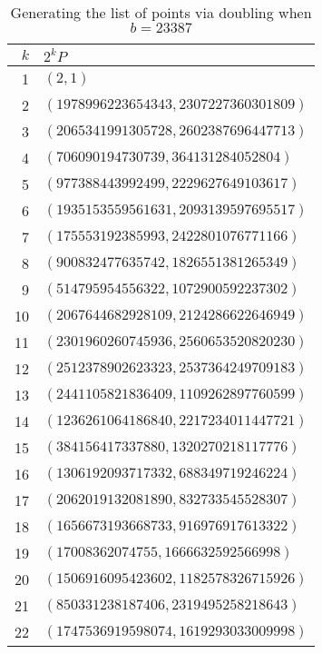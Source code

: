 \begin{table}[htbp]
	\centering
	\begin{tabular}{r|l}
		$k$ & $2^k P$\\
		\hline
		1 & $(2, 1)$\\
		2 & $(1978996223654343, 2307227360301809)$\\
		3 & $(2065341991305728, 2602387696447713)$\\
		4 & $(706090194730739, 364131284052804)$\\
		5 & $(977388443992499, 2229627649103617)$\\
		6 & $(1935153559561631, 2093139597695517)$\\
		7 & $(175553192385993, 2422801076771166)$\\
		8 & $(900832477635742, 1826551381265349)$\\
		9 & $(514795954556322, 1072900592237302)$\\
		10 & $(2067644682928109, 2124286622646949)$\\
		11 & $(2301960260745936, 2560653520820230)$\\
		12 & $(2512378902623323, 2537364249709183)$\\
		13 & $(2441105821836409, 1109262897760599)$\\
		14 & $(1236261064186840, 2217234011447721)$\\
		15 & $(384156417337880, 1320270218117776)$\\
		16 & $(1306192093717332, 688349719246224)$\\
		17 & $(2062019132081890, 832733545528307)$\\
		18 & $(1656673193668733, 916976917613322)$\\
		19 & $(17008362074755, 1666632592566998)$\\
		20 & $(1506916095423602, 1182578326715926)$\\
		21 & $(850331238187406, 2319495258218643)$\\
		22 & $(1747536919598074, 1619293033009998)$
	\end{tabular}
	\label{successfuldouble}
	\caption{Generating the list of points via doubling when $b=23387$}
\end{table}


